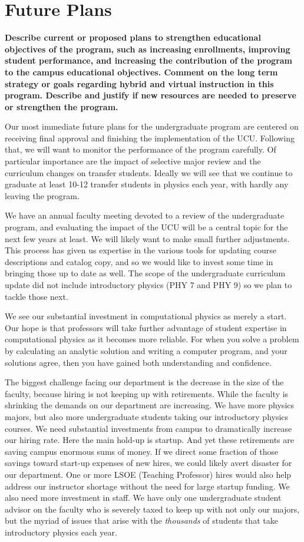 \documentclass[12pt]{article}
\begin{document}
\newpage
\section{Future Plans}
\label{sec:future}
{\bf Describe current or proposed plans to strengthen educational
  objectives of the program, such as increasing enrollments, improving
  student performance, and increasing the contribution of the program
  to the campus educational objectives. Comment on the long term
  strategy or goals regarding hybrid and virtual instruction in this
  program. Describe and justify if new resources are needed to
  preserve or strengthen the program.}

Our most immediate future plans for the undergraduate program are
centered on receiving final approval and finishing the implementation
of the UCU.  Following that, we will want to monitor the performance
of the program carefully.  Of particular importance are the impact of
selective major review and the curriculum changes on transfer
students.  Ideally we will see that we continue to graduate at least
10-12 transfer students in physics each year, with hardly any leaving
the program.

We have an annual faculty meeting devoted to a review of the
undergraduate program, and evaluating the impact of the UCU will be a
central topic for the next few years at least.  We will likely want to
make small further adjustments.  This process has given us expertise
in the various tools for updating course descriptions and catalog
copy, and so we would like to invest some time in bringing those up to
date as well.  The scope of the undergraduate curriculum update did
not include introductory physics (PHY 7 and PHY 9) so we plan to
tackle those next.

We see our substantial investment in computational physics as merely a
start.  Our hope is that professors will take further advantage of
student expertise in computational physics as it becomes more
reliable.  For when you solve a problem by calculating an analytic solution and writing
a computer program, and your solutions agree, then you have gained both
understanding and confidence.

The biggest challenge facing our department is the decrease in the
size of the faculty, because hiring is not keeping up with
retirements.  While the faculty is shrinking the demands on our
department are increasing.  We have more physics majors, but also more
undergraduate students taking our introductory physics courses.  We
need substantial investments from campus to dramatically increase our
hiring rate.  Here the main hold-up is startup.  And yet these
retirements are saving campus enormous sums of money.  If we direct
some fraction of those savings toward start-up expenses of new hires,
we could likely avert disaster for our department.  One or more LSOE
(Teaching Professor) hires would also help address our instructor
shortage without the need for large startup funding.  We also need more
investment in staff.  We have only one undergraduate student advisor
on the faculty who is severely taxed to keep up with not only our
majors, but the myriad of issues that arise with the {\em thousands}
of students that take introductory physics each year.
\end{document}

